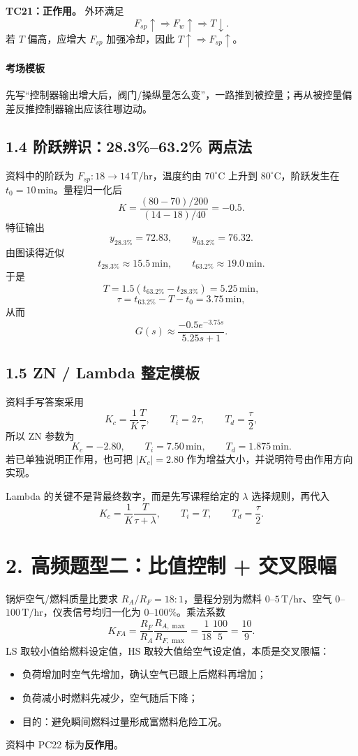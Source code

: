 \documentclass[UTF8,a4paper,10.5pt]{ctexart}
\begin{document}
\textbf{TC21：正作用。}
外环满足
\[
F_{sp}\uparrow\Rightarrow F_w\uparrow\Rightarrow T\downarrow.
\]
若 $T$ 偏高，应增大 $F_{sp}$ 加强冷却，因此 $T\uparrow\Rightarrow F_{sp}\uparrow$。

\paragraph{考场模板}
先写“控制器输出增大后，阀门/操纵量怎么变”，一路推到被控量；再从被控量偏差反推控制器输出应该往哪边动。

\subsection*{1.4 阶跃辨识：28.3\%--63.2\% 两点法}
资料中的阶跃为 $F_{sp}:18\rightarrow14\,\mathrm{T/hr}$，温度约由 $70^\circ\mathrm C$ 上升到 $80^\circ\mathrm C$，阶跃发生在 $t_0=10\,\mathrm{min}$。量程归一化后
\[
K=\frac{(80-70)/200}{(14-18)/40}=-0.5.
\]
特征输出
\[
y_{28.3\%}=72.83,\qquad y_{63.2\%}=76.32.
\]
由图读得近似
\[
t_{28.3\%}\approx15.5\,\mathrm{min},\qquad
t_{63.2\%}\approx19.0\,\mathrm{min}.
\]
于是
\[
T=1.5(t_{63.2\%}-t_{28.3\%})=5.25\,\mathrm{min},
\]
\[
\tau=t_{63.2\%}-T-t_0=3.75\,\mathrm{min},
\]
从而
\[
G(s)\approx\frac{-0.5e^{-3.75s}}{5.25s+1}.
\]

\subsection*{1.5 ZN / Lambda 整定模板}
资料手写答案采用
\[
K_c=\frac{1}{K}\frac{T}{\tau},\qquad T_i=2\tau,\qquad T_d=\frac{\tau}{2},
\]
所以 ZN 参数为
\[
K_c=-2.80,\qquad T_i=7.50\,\mathrm{min},\qquad T_d=1.875\,\mathrm{min}.
\]
若已单独说明正作用，也可把 $|K_c|=2.80$ 作为增益大小，并说明符号由作用方向实现。

Lambda 的关键不是背最终数字，而是先写课程给定的 $\lambda$ 选择规则，再代入
\[
K_c=\frac{1}{K}\frac{T}{\tau+\lambda},\qquad T_i=T,\qquad T_d=\frac{\tau}{2}.
\]

\section*{2. 高频题型二：比值控制 + 交叉限幅}
锅炉空气/燃料质量比要求 $R_A/R_F=18:1$，量程分别为燃料 $0$--$5\,\mathrm{T/hr}$、空气 $0$--$100\,\mathrm{T/hr}$，仪表信号均归一化为 $0$--$100\%$。乘法系数
\[
\boxed{K_{FA}=\frac{R_F}{R_A}\frac{R_{A,\max}}{R_{F,\max}}
=\frac{1}{18}\frac{100}{5}=\frac{10}{9}}.
\]
LS 取较小值给燃料设定值，HS 取较大值给空气设定值，本质是交叉限幅：
\begin{itemize}[leftmargin=2em]
\item 负荷增加时空气先增加，确认空气已跟上后燃料再增加；
\item 负荷减小时燃料先减少，空气随后下降；
\item 目的：避免瞬间燃料过量形成富燃料危险工况。
\end{itemize}
资料中 PC22 标为\textbf{反作用}。
\end{document}
